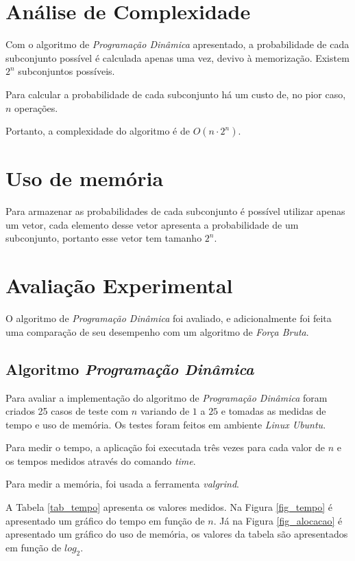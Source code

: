 \documentclass[10pt,a4paper]{article}
\begin{document}
	\section{Análise de Complexidade}

	Com o algoritmo de \emph{Programação Dinâmica} apresentado, a probabilidade de cada subconjunto possível é calculada apenas uma vez, devivo à memorização. Existem $2^n$ subconjuntos possíveis. 

	Para calcular a probabilidade de cada subconjunto há um custo de, no pior caso, $n$ operações. 

	Portanto, a complexidade do algoritmo é de $O(n \cdot 2^n)$. 

    \section{Uso de memória}

    Para armazenar as probabilidades de cada subconjunto é possível utilizar apenas um vetor, cada elemento desse vetor apresenta a probabilidade de um subconjunto, portanto esse vetor tem tamanho $2^n$.

	\section{Avaliação Experimental}

	O algoritmo de \emph{Programação Dinâmica} foi avaliado, e adicionalmente foi feita uma comparação de seu desempenho com um algoritmo de \emph{Força Bruta}.

	\subsection{Algoritmo \emph{Programação Dinâmica}}

	Para avaliar a implementação do algoritmo de \emph{Programação Dinâmica} foram criados 25 casos de teste com $n$ variando de $1$ a $25$ e tomadas as medidas de tempo e uso de memória. Os testes foram feitos em ambiente \emph{Linux Ubuntu}.

	Para medir o tempo, a aplicação foi executada três vezes para cada valor de $n$ e os tempos medidos através do comando \emph{time}.

	Para medir a memória, foi usada a ferramenta \emph{valgrind}.

	A Tabela \ref{tab_tempo} apresenta os valores medidos. Na Figura \ref{fig_tempo} é apresentado um gráfico do tempo em função de $n$. Já na Figura \ref{fig_alocacao} é apresentado um gráfico do uso de memória, os valores da tabela são apresentados em função de $log_2$.
\end{document}

